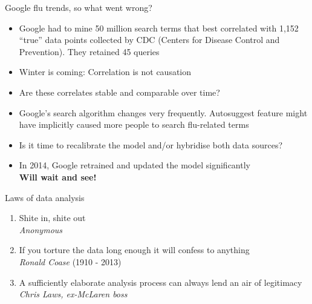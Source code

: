 \documentclass[pdf]{beamer}
\begin{document}
\begin{frame}{Google flu trends, so what went wrong?}
\begin{itemize}\addtolength{\itemsep}{0.5\baselineskip}
	\item<1-> Google had to mine 50 million search terms that best correlated with 1,152 ``true'' data points 
	collected by CDC (Centers for Disease Control and Prevention). They retained 45 queries 
	\item<2-> Winter is coming: Correlation is not causation
	\item<3-> Are these correlates stable and comparable over time?
	\item<4-> Google's search algorithm changes very frequently. Autosuggest feature might have implicitly 
	caused more people to search flu-related terms 
	\item<5-> Is it time to recalibrate the model and/or hybridise both data sources?
	\item<6-> In 2014, Google retrained and updated the model significantly\\ 
	\textbf{Will wait and see!}
\end{itemize}
\end{frame}
\begin{frame}{Laws of data analysis}
\begin{enumerate}\addtolength{\itemsep}{1.5\baselineskip}
	\item<2-> Shite in, shite out\\
			\textit{Anonymous}
	\item<3-> If you torture the data long enough it will confess to anything\\
			\textit{Ronald Coase} (1910 - 2013)
	\item<4-> A sufficiently elaborate analysis process can always lend an air of legitimacy\\ 
			\textit{Chris Laws, ex-McLaren boss} 
\end{enumerate}
\end{frame}
\end{document}
